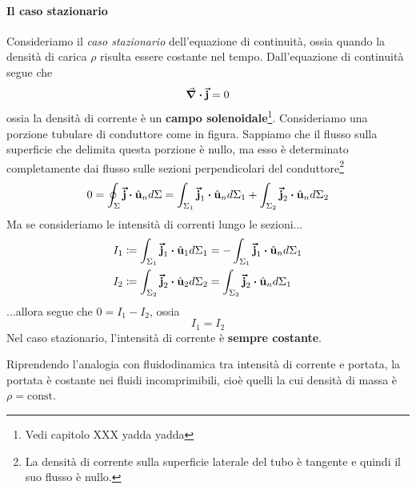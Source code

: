 \paragraph{Il caso stazionario}
	Consideriamo il \textit{caso stazionario} dell'equazione di continuità, ossia quando la densità di carica $\rho$ risulta essere costante nel tempo. Dall'equazione di continuità segue  che
	\begin{equation*}
		\div{\vb*{\va{j}}}=0
	\end{equation*}
	ossia la densità di corrente è un \textbf{campo solenoidale}\footnote{Vedi capitolo XXX yadda yadda}. Consideriamo una porzione tubulare di conduttore come in figura.
	Sappiamo che il flusso sulla superficie che delimita questa porzione è nullo, ma esso è determinato completamente dai flusso sulle sezioni perpendicolari del conduttore\footnote{La densità di corrente sulla superficie laterale del tubo è tangente e quindi il suo flusso è nullo.}
	\begin{equation*}
		0=\oint_{\Sigma}\vba{j}\vdot\vbh{u}_nd\Sigma=\int_{\Sigma_1}\vba{j}_1\vdot\vbh{u}_nd\Sigma_1+\int_{\Sigma_2}\vba{j}_2\vdot\vbh{u}_nd\Sigma_2
	\end{equation*}
	Ma se consideriamo le intensità di correnti lungo le sezioni...
	\begin{align*}
		I_1&\coloneqq\int_{\Sigma_1}\vba{j}_1\vdot\vbh{u}_1d\Sigma_1=-\int_{\Sigma_1}\vba{j}_1\vdot\vbh{u}_nd\Sigma_1\\
		I_2&\coloneqq\int_{\Sigma_2}\vba{j}_2\vdot\vbh{u}_2d\Sigma_2=\int_{\Sigma_2}\vba{j}_2\vdot\vbh{u}_nd\Sigma_1
	\end{align*}
	...allora segue che $0=I_1-I_2$, ossia
	\begin{equation}
		I_1=I_2
	\end{equation}
Nel caso stazionario, l'intensità di corrente è \textbf{sempre costante}.
\begin{intuit}
	Riprendendo l'analogia con fluidodinamica tra intensità di corrente e portata, la portata è costante nei fluidi incomprimibili, cioè quelli la cui densità di massa è $\rho=\mathrm{const}$.
\end{intuit}
